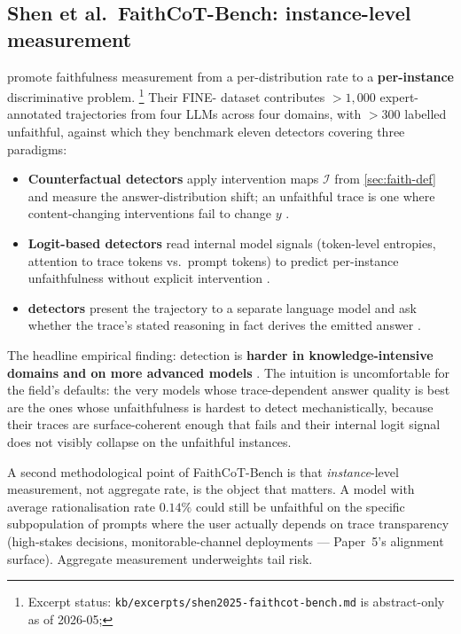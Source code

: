 \subsection{Shen et al.\ FaithCoT-Bench: instance-level measurement}
\label{sec:faith-bench}

\citet{shen2025-faithcot-bench} promote faithfulness measurement from a
per-distribution rate to a \textbf{per-instance} discriminative
problem.%
\footnote{Excerpt status:
\nolinkurl{kb/excerpts/shen2025-faithcot-bench.md} is abstract-only as of
2026-05; } Their FINE- dataset contributes
$> 1{,}000$ expert-annotated trajectories from four LLMs across four
domains, with $> 300$ labelled unfaithful, against which they
benchmark eleven detectors covering three paradigms:
\begin{itemize}
\item \textbf{Counterfactual detectors} apply intervention maps
$\mathcal{I}$ from \cref{sec:faith-def} and measure the answer-distribution
shift; an unfaithful trace is one where content-changing interventions
fail to change $y$ \citep[\S 3]{shen2025-faithcot-bench}.
\item \textbf{Logit-based detectors} read internal model signals
(token-level entropies, attention to trace tokens vs.\ prompt tokens)
to predict per-instance unfaithfulness without explicit intervention
\citep[\S 3]{shen2025-faithcot-bench}.
\item \textbf{ detectors} present the trajectory to a
separate language model and ask whether the trace's stated reasoning
in fact derives the emitted answer
\citep[\S 3]{shen2025-faithcot-bench}.
\end{itemize}
The headline empirical finding: detection is \textbf{harder in
knowledge-intensive domains and on more advanced models}
\citep[abstract]{shen2025-faithcot-bench}. The intuition is uncomfortable
for the field's defaults: the very models whose trace-dependent answer
quality is best are the ones whose unfaithfulness is hardest to detect
mechanistically, because their traces are surface-coherent enough that
 fails and their internal logit signal does not visibly
collapse on the unfaithful instances.

A second methodological point of FaithCoT-Bench is that
\emph{instance}-level measurement, not aggregate rate, is the
object that matters. A model with average rationalisation rate $0.14\%$
\citep[\S 4]{mehta2026-faithfulness-scaling} could still be unfaithful
on the specific subpopulation of prompts where the user actually depends
on trace transparency (high-stakes decisions, monitorable-channel
deployments — Paper~5's alignment surface). Aggregate measurement
underweights tail risk.

